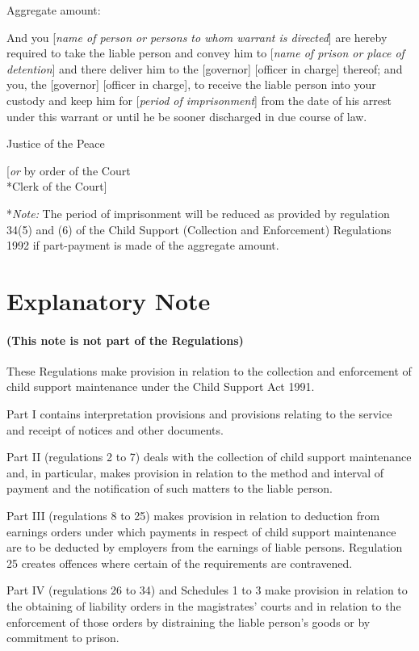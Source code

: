 \documentclass[12pt,a4paper]{article}
\begin{document}
\medskip

Aggregate amount:

\medskip

And you [\emph{name of person or persons to whom warrant is directed}] are hereby required to take the liable person and convey him to [\emph{name of prison or place of detention}] and there deliver him to the [governor] [officer in charge] thereof; and you, the [governor] [officer in charge], to receive the liable person into your custody and keep him for [\emph{period of imprisonment}] from the date of his arrest under this warrant or until he be sooner discharged in due course of law.

\medskip

{\raggedleft Justice of the Peace

\medskip

[\emph{or} by order of the Court\\*Clerk of the Court]

}

\medskip

*\emph{Note:} The period of imprisonment will be reduced as provided by regulation 34(5) and (6) of the Child Support (Collection and Enforcement) Regulations 1992 if part-payment is made of the aggregate amount.


\part{Explanatory Note}

\renewcommand\parthead{--- Explanatory Note}

\subsection*{(This note is not part of the Regulations)}

 These Regulations make provision in relation to the collection and enforcement of child support maintenance under the Child Support Act 1991.

  Part I contains interpretation provisions and provisions relating to the service and receipt of notices and other documents.

  Part II (regulations 2 to 7) deals with the collection of child support maintenance and, in particular, makes provision in relation to the method and interval of payment and the notification of such matters to the liable person.

  Part III (regulations 8 to 25) makes provision in relation to deduction from earnings orders under which payments in respect of child support maintenance are to be deducted by employers from the earnings of liable persons. Regulation 25 creates offences where certain of the requirements are contravened.

  Part IV (regulations 26 to 34) and Schedules 1 to 3 make provision in relation to the obtaining of liability orders in the magistrates' courts and in relation to the enforcement of those orders by distraining the liable person’s goods or by commitment to prison.
\end{document}
